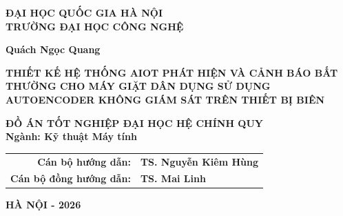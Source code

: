 \begin{center}
    {\fontsize{13}{1.3}\selectfont \textbf{ĐẠI HỌC QUỐC GIA HÀ NỘI\\TRƯỜNG ĐẠI HỌC CÔNG NGHỆ}\par}
                    
    \vspace{1.55cm}
                                
    {\fontsize{14pt}{16pt}\selectfont \textbf{Quách Ngọc Quang}\par}
    \vspace{1.5cm}
                                
    {\fontsize{18pt}{22pt}\selectfont \textbf{THIẾT KẾ HỆ THỐNG AIOT PHÁT HIỆN VÀ CẢNH BÁO BẤT THƯỜNG CHO MÁY GIẶT DÂN DỤNG SỬ DỤNG AUTOENCODER KHÔNG GIÁM SÁT TRÊN THIẾT BỊ BIÊN}\par}

    \vspace{2.5cm}

    {\fontsize{13pt}{15pt}\selectfont \textbf{ĐỒ ÁN TỐT NGHIỆP ĐẠI HỌC HỆ CHÍNH QUY\\ \vspace{0.23cm} Ngành: Kỹ thuật Máy tính}\par}
    
    \vspace{1.8cm}

    {\fontsize{13pt}{16pt}\selectfont
    \begin{tabular}{rl}
        \textbf{Cán bộ hướng dẫn:} & \textbf{TS. Nguyễn Kiêm Hùng} \\
        \textbf{Cán bộ đồng hướng dẫn:} & \textbf{TS. Mai Linh}
    \end{tabular}\par}
    \vfill
    
    {\fontsize{12}{1.3}\selectfont \textbf{HÀ NỘI - 2026}\par}
\end{center}
